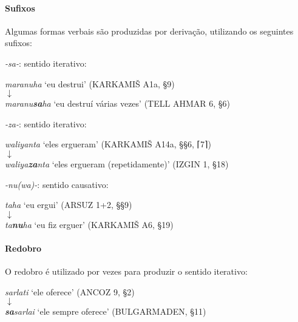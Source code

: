 \paragraph{Sufixos}
Algumas formas verbais são produzidas por derivação, utilizando os seguintes
sufixos:
\begin{compactenum}[(a)]
\item \emph{-sa-}: sentido iterativo:
	\begin{center}
	\emph{maranuha} `eu destrui' (KARKAMIŠ A1a, §9)\\
		$\downarrow$\\
	\emph{maranu\textbf{sa}ha} `eu destruí várias vezes' (TELL AHMAR 6, §6)
	\end{center}
\item \emph{-za-}: sentido iterativo:
	\begin{center}
	\emph{waliyanta} `eles ergueram' (KARKAMIŠ A14a, §§6, \textsc{⌈}7\textsc{⌉})\\
		$\downarrow$\\
	\emph{waliya\textbf{za}nta} `eles ergueram (repetidamente)' (IZGIN 1, §18)
	\end{center}
\item \emph{-nu{(wa)}-}: sentido causativo:
	\begin{center}
	\emph{taha} `eu ergui' (ARSUZ 1+2, §§9)\\
		$\downarrow$\\
	\emph{ta\textbf{nu}ha} `eu fiz erguer' (KARKAMIŠ A6, §19)
	\end{center}
\end{compactenum}

\paragraph{Redobro}
O redobro é utilizado por vezes para produzir o sentido iterativo:
\begin{center}
	\emph{sarlati} `ele oferece' (ANCOZ 9, §2)\\
	$\downarrow$\\
	\emph{\textbf{sa}sarlai} `ele sempre oferece' (BULGARMADEN, §11)
\end{center}

